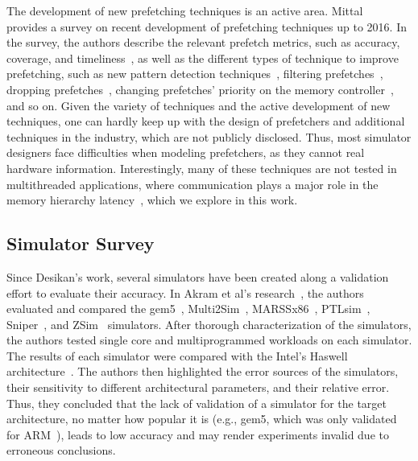 \documentclass[AMA,final,STIX1COL]{WileyNJD-v2}
\begin{document}
The development of new prefetching techniques is an active area.
Mittal~\cite{mittal2016survey} provides a survey on recent development of prefetching techniques up to 2016.
In the survey, the authors describe the relevant prefetch metrics, such as accuracy, coverage, and timeliness~\cite{srinath2007feedback}, as well as the different types of technique to improve prefetching, such as new pattern detection techniques~\cite{nesbit2004data}, filtering prefetches~\cite{zhuang2006reducing}, dropping prefetches~\cite{lee2008prefetcher}, changing prefetches' priority on the memory controller~\cite{ebrahimi2009coordinated}, and so on.
Given the variety of techniques and the active development of new techniques, one can hardly keep up with the design of prefetchers and additional techniques in the industry, which are not publicly disclosed.
Thus, most simulator designers face difficulties when modeling prefetchers, as they cannot real hardware information.
Interestingly, many of these techniques are not tested in multithreaded applications, where communication plays a major role in the memory hierarchy latency~\cite{jain2018rethinking,wu2019efficient,bhatia2019perceptron}, which we explore in this work.

\subsection{Simulator Survey} 

Since Desikan's work, several simulators have been created along a validation effort to evaluate their accuracy.
In Akram et al's research~\cite{akram2019survey}, the authors evaluated and compared the gem5~\cite{binkert2011gem5}, Multi2Sim~\cite{ubal2012multi2sim}, MARSSx86~\cite{patel2011marss}, PTLsim~\cite{yourst2007ptlsim}, Sniper~\cite{carlson2014aeohmcm}, and ZSim~\cite{sanchez2013zsim} simulators. 
After thorough characterization of the simulators, the authors tested single core and multiprogrammed workloads on each simulator. 
The results of each simulator were compared with the Intel's Haswell architecture~\cite{hammarlund2014haswell}. 
The authors then highlighted the error sources of the simulators, their sensitivity to different architectural parameters, and their relative error. 
Thus, they concluded that the lack of validation of a simulator for the target architecture, no matter how popular it is (e.g., gem5, which was only validated for ARM~\cite{gutierrez2014sources}), leads to low accuracy and may render experiments invalid due to erroneous conclusions.
\end{document}
